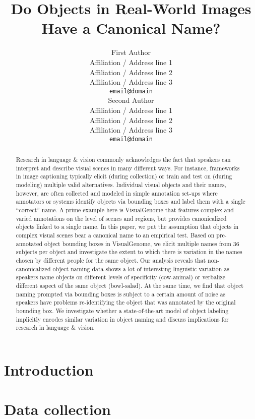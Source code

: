 \documentclass[11pt,a4paper]{article}
\title{Do Objects in Real-World Images Have a Canonical Name?}
\author{First Author \\
  Affiliation / Address line 1 \\
  Affiliation / Address line 2 \\
  Affiliation / Address line 3 \\
  {\tt email@domain} \\\And
  Second Author \\
  Affiliation / Address line 1 \\
  Affiliation / Address line 2 \\
  Affiliation / Address line 3 \\
  {\tt email@domain} \\}
\date{}
\begin{document}
\maketitle

\begin{abstract}
Research in language \& vision commonly acknowledges the fact that speakers can interpret and describe visual scenes in many different ways. For instance, frameworks in image captioning  typically elicit (during collection) or train and test on (during modeling) multiple valid alternatives. Individual visual objects and their names, however, are often collected and modeled in simple annotation set-ups where annotators or systems identify objects via bounding boxes and label them with a single ``correct'' name. A prime example here is VisualGenome that features complex and varied annotations on the level of scenes and regions, but provides canonicalized objects linked to a single name. In this paper, we put the assumption that objects in complex visual scenes bear a canonical name to an empirical test. Based on pre-annotated object bounding boxes in VisualGenome, we elicit multiple names from 36 subjects per object and investigate the extent to which there is variation in the names chosen by different people for the same object. Our analysis reveals that non-canonicalized object naming data shows a lot of interesting linguistic variation as speakers name objects on different levels of specificity (cow-animal) or verbalize different aspect of the same object (bowl-salad). At the same time, we find that object naming prompted via bounding boxes is subject to a certain amount of noise as speakers have problems re-identifying the object that was annotated by the original bounding box. We investigate whether a state-of-the-art model of object labeling implicitly encodes similar variation in object naming and discuss implications for research in language \& vision.
\end{abstract}

\section{Introduction}


%

\section{Data collection}
%
\end{document}
